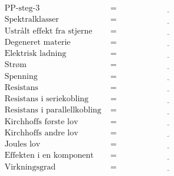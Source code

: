 \documentclass{article}
\begin{document}
\begin{align*}
    \text{PP-steg-3} &= \underline{\hspace{5cm}} \\
    \text{Spektralklasser} &= \underline{\hspace{5cm}} \\
    \text{Ustr\aa lt effekt fra stjerne} &= \underline{\hspace{5cm}} \\
    \text{Degeneret materie} &= \underline{\hspace{5cm}} \\
    \text{Elektrisk ladning} &= \underline{\hspace{5cm}} \\
    \text{Strøm} &= \underline{\hspace{5cm}} \\
    \text{Spenning} &= \underline{\hspace{5cm}} \\
    \text{Resistans} &= \underline{\hspace{5cm}} \\
    \text{Resistans i seriekobling} &= \underline{\hspace{5cm}} \\
    \text{Resistans i parallellkobling} &= \underline{\hspace{5cm}} \\
    \text{Kirchhoffs f\o rste lov} &= \underline{\hspace{5cm}} \\
    \text{Kirchhoffs andre lov} &= \underline{\hspace{5cm}} \\
    \text{Joules lov} &= \underline{\hspace{5cm}} \\
    \text{Effekten i en komponent} &= \underline{\hspace{5cm}} \\
    \text{Virkningsgrad} &= \underline{\hspace{5cm}} \\
\end{align*}



\end{document}
